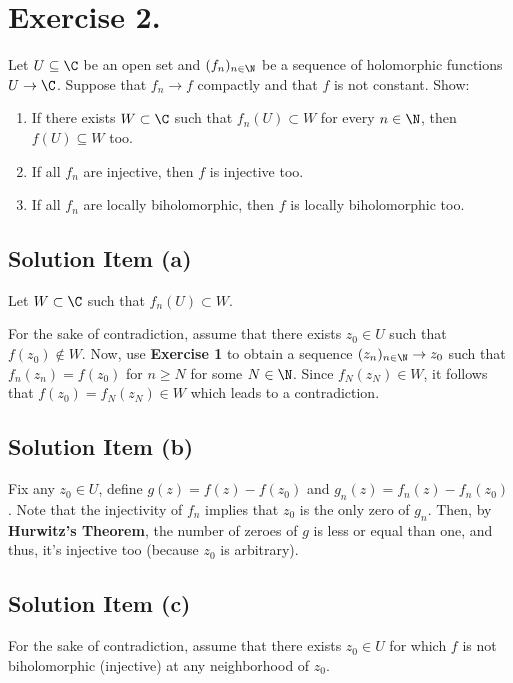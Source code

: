 \section*{Exercise 2.}

Let $U \subseteq \C$ be an open set and $(f_n)_{n\in\N}$ be a sequence of holomorphic functions $U \to\C$. Suppose that $f_n \to f$ compactly and that $f$ is not constant. Show:
\begin{enumerate}[label=(\alph*)]
    \item If there exists $W \subset \C$ such that $f_n(U) \subset W$ for every $n \in \N$, then $f(U) \subseteq W$ too.
    \item If all $f_n$ are injective, then $f$ is injective too.
    \item If all $f_n$ are locally biholomorphic, then $f$ is locally biholomorphic too.
\end{enumerate}

\subsection*{Solution Item (a)}

Let $W \subset \C$ such that $f_n(U) \subset W$.

For the sake of contradiction, assume that there exists $z_0 \in U$ such that $f(z_0) \not\in W$. Now, use \textbf{Exercise 1} to obtain a sequence $(z_n)_{n\in \N} \to z_0$ such that $f_n(z_n) = f(z_0)$ for $n \geq N$ for some $N\in \N$. Since $f_N(z_N) \in W$, it follows that $f(z_0) = f_N(z_N) \in W$ which leads to a contradiction.

\subsection*{Solution Item (b)}

Fix any $z_0 \in U$, define $g(z) = f(z) - f(z_0)$ and $g_n(z) = f_n(z) - f_n(z_0)$. Note that the injectivity of $f_n$ implies that $z_0$ is the only zero of $g_n$. Then, by \textbf{Hurwitz's Theorem}, the number of zeroes of $g$ is less or equal than one, and thus, it's injective too (because $z_0$ is arbitrary).

\subsection*{Solution Item (c)}

For the sake of contradiction, assume that there exists $z_0 \in U$ for which $f$ is not biholomorphic (injective) at any neighborhood of $z_0$.

